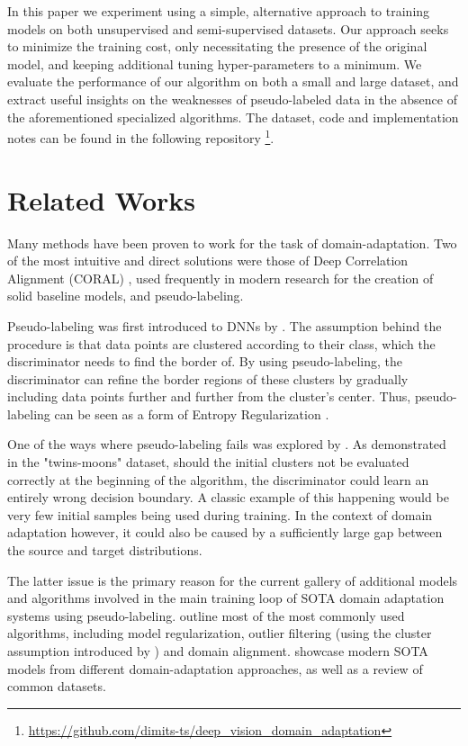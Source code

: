 \documentclass{article}
\begin{document}
	In this paper we experiment using a simple, alternative approach to training models on both unsupervised and semi-supervised datasets. Our approach seeks to minimize the training cost, only necessitating the presence of the original model, and keeping additional tuning hyper-parameters to a minimum. We evaluate the performance of our algorithm on both a small and large dataset, and extract useful insights on the weaknesses of pseudo-labeled data in the absence of the aforementioned specialized algorithms. The dataset, code and implementation notes can be found in the following repository \footnote{\url{https://github.com/dimits-ts/deep\_vision\_domain\_adaptation}}.
	
	
	\section{Related Works}
	
	Many methods have been proven to work for the task of domain-adaptation. Two of the most intuitive and direct solutions were those of Deep Correlation Alignment (CORAL) \parencite{coral}, used frequently in modern research for the creation of solid baseline models, and pseudo-labeling.
	
	Pseudo-labeling was first introduced to DNNs by \cite{pseudo-label-original}. The assumption behind the procedure is that data points are clustered according to their class, which the discriminator needs to find the border of. By using pseudo-labeling, the discriminator can refine the border regions of these clusters by gradually including data points further and further from the cluster's center. Thus, pseudo-labeling can be seen as a form of Entropy Regularization \parencite{entropy-regularization}.
	
	One of the ways where pseudo-labeling fails was explored by \cite{pseudo-label-evaluation}. As demonstrated in the "twins-moons" dataset, should the initial clusters not be evaluated correctly at the beginning of the algorithm, the discriminator could learn an entirely wrong decision boundary. A classic example of this happening would be very few initial samples being used during training. In the context of domain adaptation however, it could also be caused by a sufficiently large gap between the source and target distributions.
	
	The latter issue is the primary reason for the current gallery of additional models and algorithms involved in the main training loop of SOTA domain adaptation systems using pseudo-labeling. \cite{good-practices} outline most of the most commonly used algorithms, including model regularization, outlier filtering (using the cluster assumption introduced by \cite{pseudo-label-original}) and domain alignment. \cite{model-survey} showcase modern SOTA models from different domain-adaptation approaches, as well as a review of common datasets.
	
\end{document}
